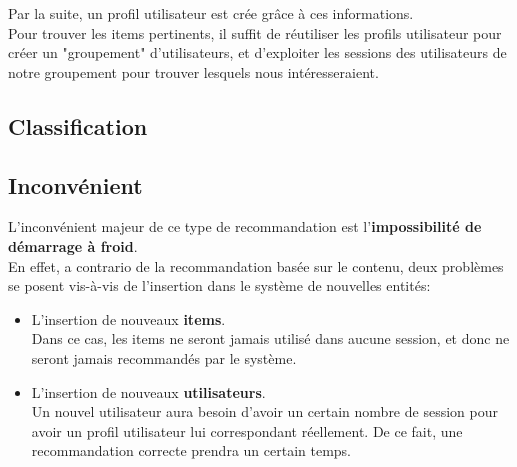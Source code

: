         Par la suite, un profil utilisateur est crée grâce à ces informations.\\
        Pour trouver les items pertinents, il suffit de réutiliser les profils utilisateur pour créer un "groupement" d'utilisateurs, et d'exploiter les sessions des utilisateurs de notre groupement pour trouver lesquels nous intéresseraient.\\
        \subsection{Classification}
        \subsection{Inconvénient}
            L'inconvénient majeur de ce type de recommandation est l'\textbf{impossibilité de démarrage à froid}.\\
            En effet, a contrario de la recommandation basée sur le contenu, deux problèmes se posent vis-à-vis de l'insertion dans le système de nouvelles entités:
            \begin{itemize}
                \item L'insertion de nouveaux \textbf{items}.\\
                    Dans ce cas, les items ne seront jamais utilisé dans aucune session, et donc ne seront jamais recommandés par le système.
                \item L'insertion de nouveaux \textbf{utilisateurs}.\\
                    Un nouvel utilisateur aura besoin d'avoir un certain nombre de session pour avoir un profil utilisateur lui correspondant réellement. De ce fait, une recommandation correcte prendra un certain temps.
            \end{itemize}
